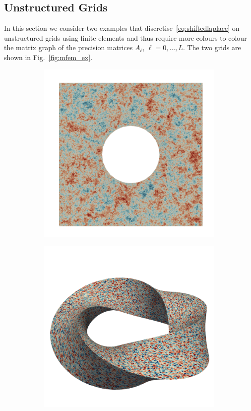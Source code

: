 \documentclass[
fontsize=11pt,
paper=a4,
numbers=noenddot
]{scrartcl}
\begin{document}
\subsection{Unstructured Grids}
In this section we consider two examples that discretise~\eqref{eq:shiftedlaplace} on unstructured grids using finite elements and thus require more colours to colour the matrix graph of the precision matrices $A_\ell$, $\ell = 0, \dotsc, L$. The two grids are shown in Fig.~\ref{fig:mfem_ex}.

\begin{figure}[htbp]
    \centering
    \begin{subfigure}[b]{0.49\textwidth}
        \centering
        \includegraphics[width=\textwidth]{plots/paraview/square-disc_0_05.png}
    \end{subfigure}
    \hfill
    \begin{subfigure}[b]{0.49\textwidth}
        \centering
        \includegraphics[width=\textwidth]{plots/paraview/toroid_1.png}

\end{subfigure}
\end{figure}
\end{document}
